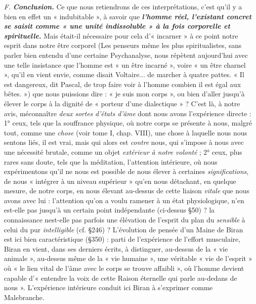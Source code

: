 {\it F.} \textbf{\textit {Conclusion.}} Ce que nous retiendrons de ces interprétations,
c’est qu’il y a bien en effet un « indubitable », à savoir que \textbf{\textit {l’homme
réel, l'existant concret se saisit comme « une unité indissoluble »
à la fois corporelle et spirituelle.}} Mais était-il nécessaire pour cela
d’« incarner » à ce point notre esprit dans notre être corporel
{\scriptsize (Les penseurs même les plus spiritualistes, sans parler bien entendu d'une certaine
Psychanalyse, nous répètent aujourd'hui avec une telle insistance que l'homme est
« un être incarné », voire « un être charnel », qu'il en vient envie, comme disait Voltaire...
de marcher à quatre pattes. « Il est dangereux, dit Pascal, de trop faire voir à l’homme
combien il est égal aux bêtes. »)} que
nous puissions dire : « je suis mon corps », ou bien d'aller jusqu'à
élever le corps à la dignité de « porteur d’une dialectique » ? C’est là,
à notre avis, méconnaître {\it deux sortes d'états d'âme} dont nous avons
l'expérience directe : 1° ceux, tels que la souffrance physique, où notre
corps se présente à nous, malgré tout, comme une {\it chose} (voir tome I,
chap. VIII), une chose à laquelle nous nous sentons liés, il est vrai,
mais qui alors est {\it contre} nous, qui s'impose à nous avec une nécessité
brutale, comme un objet {\it extérieur à notre volonté} ; 2° ceux, plus rares
sans doute, tels que la méditation, l'attention intérieure, où nous
expérimentons qu’il ne nous est possible de nous élever à certaines
{\it significations}, de nous « intégrer à un niveau supérieur » qu'en nous
détachant, en quelque mesure, de notre corps, en nous élevant au-dessus
de cette liaison {\it vitale} que nous avons avec lui : l’attention qu'on
a voulu ramener à un état physiologique, n’en est-elle pas jusqu'à un
certain point indépendante (ci-dessus \S 50) ? la connaissance nest-elle
pas parfois une élévation de l'esprit du plan du {\it sensible} à celui du pur
{\it intelligible} (cf. \S 246) ? L'évolution de pensée d’un Maine de Biran
est ici bien caractéristique (\S350) : parti de l'expérience de
l'effort musculaire, Biran en vient, dans ses derniers écrits, à distinguer,
au-dessus de la « vie animale », au-dessus même de la « vie
humaine », une véritable « vie de l'esprit » où « le lien vital de l'âme
avec le corps se trouve affaibli », où l’homme devient capable d’« entendre
la voix de cette Raison éternelle qui parle au-dedans de nous ».
L'expérience intérieure conduit ici Biran à s'exprimer comme Malebranche.

